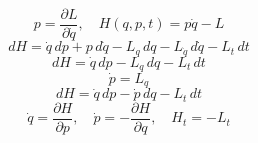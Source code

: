 \documentclass{article}
\begin{document}
\[
p=\frac{\partial L}{\partial\dot q},\quad H(q,p,t)=p\dot q-L
\]
\[
dH=\dot q\,dp+p\,d\dot q-L_q\,dq-L_{\dot q}\,d\dot q-L_t\,dt
\]
\[
dH=\dot q\,dp-L_q\,dq-L_t\,dt
\]
\[
\dot p=L_q
\]
\[
dH=\dot q\,dp-\dot p\,dq-L_t\,dt
\]
\[
\dot q=\frac{\partial H}{\partial p},\quad\dot p=-\frac{\partial H}{\partial q},\quad H_t=-L_t
\]
\end{document}
